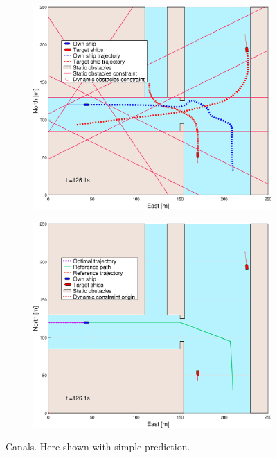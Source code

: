 \begin{figure}[ht]
\begin{subfigure}[b]{0.494\textwidth}
        \subcaption{}
    \end{subfigure}
    \hfill
    \\ 
    \begin{subfigure}[b]{0.494\textwidth}
        \centering
        \includegraphics[width=\textwidth]{Images/Figures/Havn1/_Simple_1fig1_time=126}
        \subcaption{}
    \end{subfigure}
    \hfill
    \begin{subfigure}[b]{0.494\textwidth}
        \centering
        \includegraphics[width=\textwidth]{Images/Figures/Havn1/_Simple_1fig999_time=126}
        \subcaption{}
    \end{subfigure}
    \hfill
    \caption{Canals. Here shown with simple prediction.}

\end{figure}

